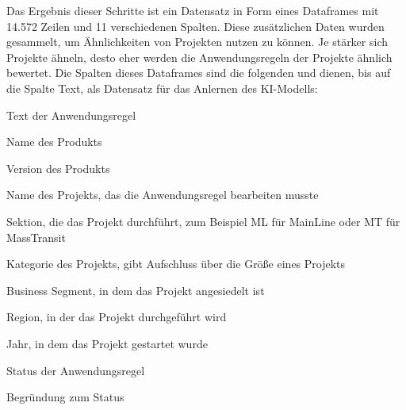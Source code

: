 Das Ergebnis dieser Schritte ist ein Datensatz in Form eines Dataframes mit 14.572 Zeilen und 11 verschiedenen Spalten. Diese zusätzlichen Daten wurden gesammelt, um Ähnlichkeiten von Projekten 
nutzen zu können. Je stärker sich Projekte ähneln, desto eher werden die Anwendungsregeln der Projekte ähnlich bewertet. Die Spalten dieses Dataframes sind die folgenden und dienen, bis auf die 
Spalte \glqq Text\grqq{}, als Datensatz für das Anlernen des \ac{KI}-Modells:
\begin{description}[style=multiline,leftmargin=4cm,font=\bfseries, nolistsep]
    \item[Text] Text der Anwendungsregel
    \item[Product] Name des Produkts
    \item[ProductVersion] Version des Produkts
    \item[Project\_name] Name des Projekts, das die Anwendungsregel bearbeiten musste
    \item[section] Sektion, die das Projekt durchführt, zum Beispiel ML für MainLine oder MT für MassTransit
    \item[Project\_category] Kategorie des Projekts, gibt Aufschluss über die Größe eines Projekts
    \item[BS] Business Segment, in dem das Projekt angesiedelt ist
    \item[RU] Region, in der das Projekt durchgeführt wird
    \item[ProjectYear] Jahr, in dem das Projekt gestartet wurde
    \item[Status] Status der Anwendungsregel
    \item[Statement] Begründung zum Status
\end{description} 

